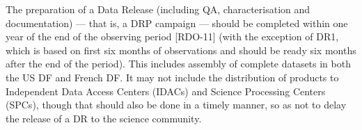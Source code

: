 The preparation of a Data Release (including QA, characterisation and documentation) --- that is, a DRP campaign --- should be completed within one year of the end of the observing period [RDO-11] (with the exception of DR1, which is based on first six months of observations and should be ready six months after the end of the period). This includes assembly of complete datasets in both the US DF and French DF. It may not include the distribution of products to Independent Data Access Centers (IDACs) and Science Processing Centers (SPCs), though that should also be done in a timely manner, so as not to delay the release of a DR to the science community.
